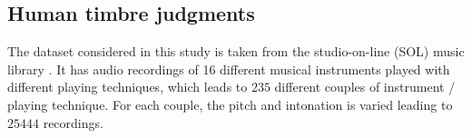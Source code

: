 \documentclass{bmcart}
\newcommand{\ml}[1]{\textcolor{blue}{ML: #1}}
\newcommand{\vl}[1]{\textcolor{red}{VL: #1}}
\begin{document}
\begin{backmatter}
%
%
%
%
%
%

\section*{Human timbre judgments}
\label{sec:subjective}

The dataset considered in this study is taken
from the studio-on-line (SOL) music library  \cite{peeters2000instrument}.
It has audio recordings of 16 different musical instruments played
with different playing techniques,
which leads to $235$ different couples of instrument / playing technique.
For each couple, the pitch and intonation is varied leading to $25444$ recordings.


\end{backmatter}
\end{document}
